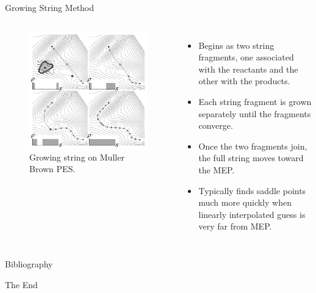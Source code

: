 \documentclass[aspectratio=169]{beamer}
\begin{document}
    \begin{frame}{Growing String Method}
        \begin{columns}

            \begin{figure}
                \centering
                \includegraphics[width=0.8\linewidth]{lectures/figures/12-Growing_String.png}
                \caption{Growing string on Muller Brown PES.\cite{petersGrowingStringMethod2004}}
            \end{figure}


            \begin{itemize}
                \item Begins as two string fragments, one associated with the reactants and the other with the products.
                \item Each string fragment is grown separately until the fragments converge.
                \item Once the two fragments join, the full string moves toward the MEP.
                \item Typically finds saddle points much more quickly when linearly interpolated guess is very far from MEP.
            \end{itemize}

        \end{columns}
    \end{frame}


    \begin{frame}[allowframebreaks]{Bibliography}
        
        
    \end{frame}



    \begin{frame}
        \Huge{\centerline{The End}}
    \end{frame}
\end{document}
